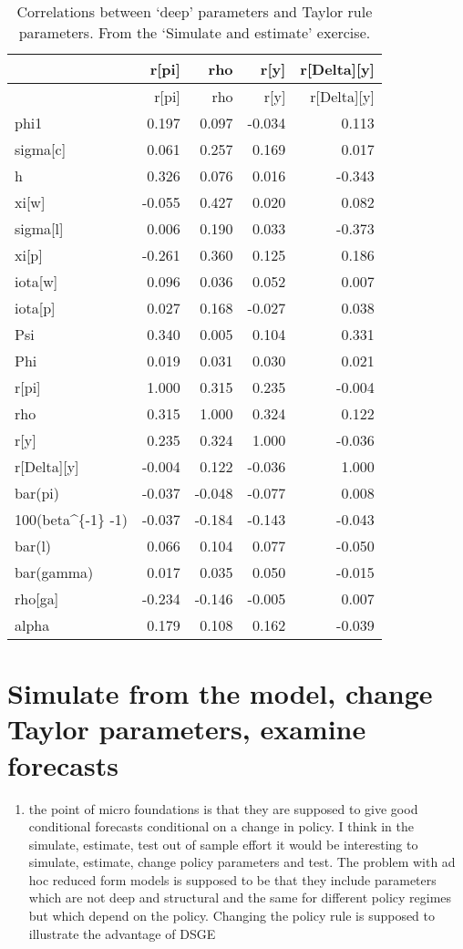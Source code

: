 \documentclass[]{article}
\providecommand{\tightlist}{%
  \setlength{\itemsep}{0pt}\setlength{\parskip}{0pt}}
\begin{document}
\begin{longtable}[]{@{}lrrrr@{}}
\caption{Correlations between `deep' parameters and Taylor rule
parameters. From the `Simulate and estimate' exercise.}\tabularnewline
\toprule
& r{[}pi{]} & rho & r{[}y{]} & r{[}Delta{]}{[}y{]}\tabularnewline
\midrule
\endfirsthead
\toprule
& r{[}pi{]} & rho & r{[}y{]} & r{[}Delta{]}{[}y{]}\tabularnewline
\midrule
\endhead
phi1 & 0.197 & 0.097 & -0.034 & 0.113\tabularnewline
sigma{[}c{]} & 0.061 & 0.257 & 0.169 & 0.017\tabularnewline
h & 0.326 & 0.076 & 0.016 & -0.343\tabularnewline
xi{[}w{]} & -0.055 & 0.427 & 0.020 & 0.082\tabularnewline
sigma{[}l{]} & 0.006 & 0.190 & 0.033 & -0.373\tabularnewline
xi{[}p{]} & -0.261 & 0.360 & 0.125 & 0.186\tabularnewline
iota{[}w{]} & 0.096 & 0.036 & 0.052 & 0.007\tabularnewline
iota{[}p{]} & 0.027 & 0.168 & -0.027 & 0.038\tabularnewline
Psi & 0.340 & 0.005 & 0.104 & 0.331\tabularnewline
Phi & 0.019 & 0.031 & 0.030 & 0.021\tabularnewline
r{[}pi{]} & 1.000 & 0.315 & 0.235 & -0.004\tabularnewline
rho & 0.315 & 1.000 & 0.324 & 0.122\tabularnewline
r{[}y{]} & 0.235 & 0.324 & 1.000 & -0.036\tabularnewline
r{[}Delta{]}{[}y{]} & -0.004 & 0.122 & -0.036 & 1.000\tabularnewline
bar(pi) & -0.037 & -0.048 & -0.077 & 0.008\tabularnewline
100(beta\^{}\{-1\} -1) & -0.037 & -0.184 & -0.143 &
-0.043\tabularnewline
bar(l) & 0.066 & 0.104 & 0.077 & -0.050\tabularnewline
bar(gamma) & 0.017 & 0.035 & 0.050 & -0.015\tabularnewline
rho{[}ga{]} & -0.234 & -0.146 & -0.005 & 0.007\tabularnewline
alpha & 0.179 & 0.108 & 0.162 & -0.039\tabularnewline
\bottomrule
\end{longtable}

\hypertarget{simulate-from-the-model-change-taylor-parameters-examine-forecasts}{%
\section{Simulate from the model, change Taylor parameters, examine
forecasts}\label{simulate-from-the-model-change-taylor-parameters-examine-forecasts}}

\begin{enumerate}
\def\labelenumi{\arabic{enumi})}
\setcounter{enumi}{2}
\tightlist
\item
  the point of micro foundations is that they are supposed to give good
  conditional forecasts conditional on a change in policy. I think in
  the simulate, estimate, test out of sample effort it would be
  interesting to simulate, estimate, change policy parameters and test.
  The problem with ad hoc reduced form models is supposed to be that
  they include parameters which are not deep and structural and the same
  for different policy regimes but which depend on the policy. Changing
  the policy rule is supposed to illustrate the advantage of DSGE
\end{enumerate}
\end{document}
